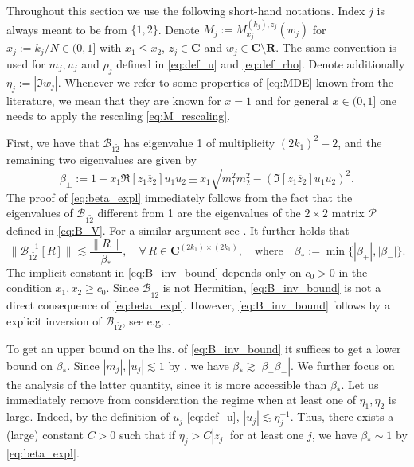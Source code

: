 \documentclass[10pt]{amsart}
\numberwithin{equation}{section}
\newcommand{\R}{\mathbf{R}}
\newcommand{\C}{\mathbf{C}}
\begin{document}
Throughout this section we use the following short-hand notations. Index $j$ is always meant to be from $\{1,2\}$. Denote $M_j:=M^{(k_j),z_j}_{x_j}(w_j)$ for $x_j:=k_j/N\in (0,1]$ with $x_1\le x_2$, $z_j\in \C$ and $w_j\in\C\setminus\R$. The same convention is used for $m_j, u_j$ and $\rho_j$ defined in \eqref{eq:def_u} and \eqref{eq:def_rho}. Denote additionally $\eta_j:=|\Im w_j|$. Whenever we refer to some properties of \eqref{eq:MDE} known from the literature, we mean that they are known for $x=1$ and for general $x\in (0,1]$ one needs to apply the rescaling \eqref{eq:M_rescaling}.  

First, we have that $\mathcal{B}_{1\widetilde{2}}$ has eigenvalue 1 of multiplicity $(2k_1)^2-2$, and the remaining two eigenvalues are given by
\begin{equation}
\beta_\pm := 1-x_1\Re [z_1\overline{z}_2] u_1u_2 \pm x_1\sqrt{m_1^2m_2^2 -(\Im [z_1\overline{z}_2]u_1u_2)^2}.
\label{eq:beta_expl}
\end{equation}
The proof of \eqref{eq:beta_expl} immediately follows from the fact that the eigenvalues of $\mathcal{B}_{1\widetilde{2}}$ different from 1 are the eigenvalues of the $2\times 2$ matrix $\mathcal{P}$ defined in \eqref{eq:B_V}. For a similar argument see \cite[Eq.(6.3)-(6.4)]{macroCLT_complex}. It further holds that
\begin{equation}
\|\mathcal{B}_{1\widetilde{2}}^{-1}[R]\|\lesssim \frac{\|R\|}{\beta_*},\quad\forall\, R\in\C^{(2k_1)\times(2k_1)},\quad \text{where}\quad \beta_*:=\min\{|\beta_+|,|\beta_-|\}.
\label{eq:B_inv_bound}
\end{equation}
The implicit constant in \eqref{eq:B_inv_bound} depends only on $c_0>0$ in the condition $x_1,x_2\ge c_0$. Since $\mathcal{B}_{1\widetilde{2}}$ is not Hermitian, \eqref{eq:B_inv_bound} is not a direct consequence of \eqref{eq:beta_expl}. However, \eqref{eq:B_inv_bound} follows by a explicit inversion of $\mathcal{B}_{1\widetilde{2}}$, see e.g. \cite[Lemma~S2.8(1)]{hyperuniformity}.

To get an upper bound on the lhs. of \eqref{eq:B_inv_bound} it suffices to get a lower bound on $\beta_*$. Since $|m_j|, |u_j|\lesssim 1$ by \cite[Eq.(3.5)]{macroCLT_complex}, we have $\beta_*\gtrsim |\beta_+\beta_-|$. We further focus on the analysis of the latter quantity, since it is more accessible than $\beta_*$. Let us immediately remove from consideration the regime when at least one of $\eta_1,\eta_2$ is large. Indeed, by the definition of $u_j$ \eqref{eq:def_u}, $|u_j|\lesssim \eta_j^{-1}$. Thus, there exists a (large) constant $C>0$ such that if $\eta_j>C|z_j|$ for at least one $j$, we have $\beta_*\sim 1$ by \eqref{eq:beta_expl}. 
\end{document}
